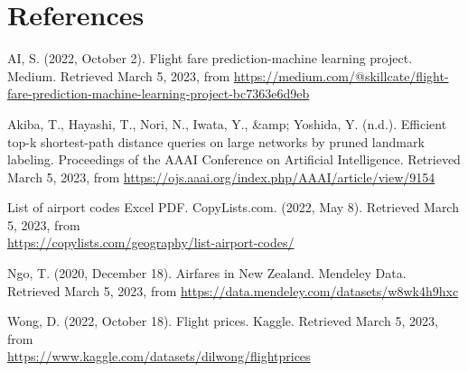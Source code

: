\documentclass[11pt]{article}
\begin{document}
\normalsize

\section*{References}
AI, S. (2022, October 2). Flight fare prediction-machine learning project. Medium. Retrieved March 5, 2023, from \href{https://medium.com/@skillcate/flight-fare-prediction-machine-learning-project-bc7363e6d9eb}{https://medium.com/@skillcate/flight-fare-prediction-machine-learning-project-bc7363e6d9eb}

\vspace{.2cm}

Akiba, T., Hayashi, T., Nori, N., Iwata, Y., \&amp; Yoshida, Y. (n.d.). Efficient top-k shortest-path distance queries on large networks by pruned landmark labeling. Proceedings of the AAAI Conference on Artificial Intelligence. Retrieved March 5, 2023, from \href{https://ojs.aaai.org/index.php/AAAI/article/view/9154}{https://ojs.aaai.org/index.php/AAAI/article/view/9154}

\vspace{.2cm}

List of airport codes Excel PDF. CopyLists.com. (2022, May 8). Retrieved March 5, 2023, from \\ \href{https://copylists.com/geography/list-airport-codes/}{https://copylists.com/geography/list-airport-codes/} 

\vspace{.2cm}

Ngo, T. (2020, December 18). Airfares in New Zealand. Mendeley Data. Retrieved March 5, 2023, from \href{https://data.mendeley.com/datasets/w8wk4h9hxc}{https://data.mendeley.com/datasets/w8wk4h9hxc}

\vspace{.2cm}

Wong, D. (2022, October 18). Flight prices. Kaggle. Retrieved March 5, 2023, from \\ \href{https://www.kaggle.com/datasets/dilwong/flightprices}{https://www.kaggle.com/datasets/dilwong/flightprices}


\end{document}

